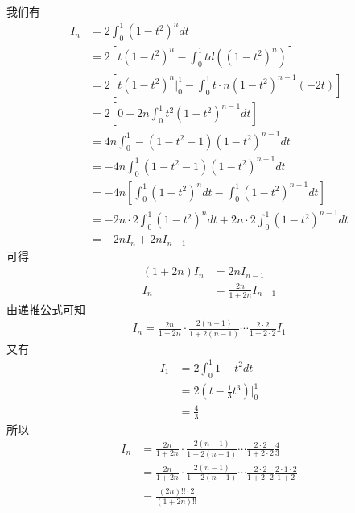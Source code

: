\documentclass{article}
\begin{document}
\begin{itemize}
        我们有
        \begin{align*}
          I_n & = 2 \int_{0}^{1} (1 - t^2)^n dt                                                                \\
              & = 2 \left[ t(1 - t^2)^n - \int_{0}^{1} t d((1 - t^2)^n) \right]                                \\
              & = 2 \left[ t(1 - t^2)^n \bigg|_{0}^{1} - \int_{0}^{1} t \cdot n (1 - t^2)^{n - 1}(-2t) \right] \\
              & = 2 \left[ 0 + 2n \int_{0}^{1} t^2 (1 - t^2)^{n - 1} dt \right]                                \\
              & = 4n \int_{0}^{1} -(1 - t^2 - 1) (1 - t^2)^{n - 1} dt                                          \\
              & = - 4n \int_{0}^{1} (1 - t^2 - 1) (1 - t^2)^{n - 1} dt                                         \\
              & = -4n \left[\int_{0}^{1} (1 - t^2)^{n} dt - \int_{0}^{1} (1 - t^2)^{n - 1} dt \right]          \\
              & = -2n \cdot 2 \int_{0}^{1} (1 - t^2)^{n} dt + 2n \cdot 2 \int_{0}^{1} (1 - t^2)^{n - 1} dt     \\
              & = -2n I_n + 2n I_{n-1}
        \end{align*}
        可得
        \begin{align*}
          (1 + 2n)I_n & = 2n I_{n-1}                \\
          I_n         & = \frac{2n}{1 + 2n} I_{n-1}
        \end{align*}
        由递推公式可知
        \begin{align*}
          I_n = \frac{2n}{1 + 2n} \cdot \frac{2(n - 1)}{1 + 2(n - 1)} \cdots \frac{2 \cdot 2}{1 + 2 \cdot 2} I_1
        \end{align*}
        又有
        \begin{align*}
          I_1 & = 2 \int_{0}^{1} 1 - t^2 dt             \\
              & = 2 (t - \frac{1}{3}t^3) \bigg|_{0}^{1} \\
              & = \frac{4}{3}
        \end{align*}
        所以
        \begin{align*}
          I_n
           & = \frac{2n}{1 + 2n} \cdot \frac{2(n - 1)}{1 + 2(n - 1)} \cdots \frac{2 \cdot 2}{1 + 2 \cdot 2} \frac{4}{3}                     \\
           & = \frac{2n}{1 + 2n} \cdot \frac{2(n - 1)}{1 + 2(n - 1)} \cdots \frac{2 \cdot 2}{1 + 2 \cdot 2} \frac{2 \cdot 1 \cdot 2}{1 + 2} \\
           & = \frac{(2n)!! \cdot 2}{(1 + 2n)!!}
        \end{align*}
\end{itemize}
\end{document}
